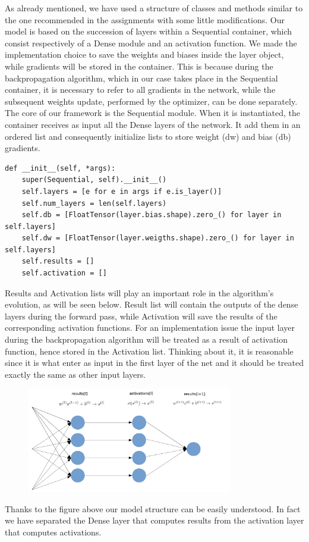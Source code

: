 As already mentioned, we have used a structure of classes and methods similar to the one recommended in the assignments with some little modifications. Our model is based on the succession of layers within a Sequential container, which consist respectively of a Dense module and an activation function. We made the implementation choice to save the weights and biases inside the layer object, while gradients will be stored in the container. This is because during the backpropagation algorithm, which in our case takes place in the Sequential container, it is necessary to refer to all gradients in the network, while the subsequent weights update, performed by the optimizer, can be done separately. \\
The core of our framework is the Sequential module. When it is instantiated, the container receives as input all the Dense layers of the network. It add them in an ordered list and consequently initialize lists to store weight (dw) and bias (db) gradients.

\begin{verbatim}
def __init__(self, *args):
	super(Sequential, self).__init__()
	self.layers = [e for e in args if e.is_layer()]
	self.num_layers = len(self.layers)
	self.db = [FloatTensor(layer.bias.shape).zero_() for layer in self.layers]
	self.dw = [FloatTensor(layer.weigths.shape).zero_() for layer in self.layers]
	self.results = [] 
	self.activation = []
\end{verbatim}

Results and Activation lists will play an important role in the algorithm's evolution, as will be seen below. Result list will contain the outputs of the dense layers during the forward pass, while Activation will save the results of the corresponding activation functions. For an implementation issue the input layer during the backpropagation algorithm will be treated as a result of activation function, hence stored in the Activation list. Thinking about it, it is reasonable since it is what enter as input in the first layer of the net and it should be treated exactly the same as other input layers. 
\begin{figure}[H]
	\includegraphics[width=0.8\textwidth]{Images/netowrk.png}
	\centering
\end{figure}
Thanks to the figure above our model structure can be easily understood. In fact we have separated the Dense layer that computes results from the activation layer that computes activations. 
